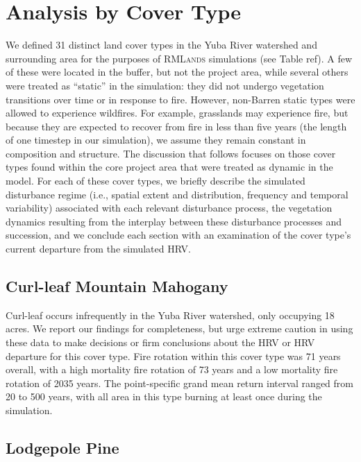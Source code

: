 \section{Analysis by Cover Type}
We defined 31 distinct land cover types in the Yuba River watershed and surrounding area for the purposes of \textsc{RMLands} simulations (see Table ref{}). A few of these were located in the buffer, but not the project area, while several others were treated as ``static'' in the simulation: they did not undergo vegetation transitions over time or in response to fire. However, non-Barren static types were allowed to experience wildfires. For example, grasslands may experience fire, but because they are expected to recover from fire in less than five years (the length of one timestep in our simulation), we assume they remain constant in composition and structure. The discussion that follows focuses on those cover types found within the core project area that were treated as dynamic in the model. For each of these cover types, we briefly describe the simulated disturbance regime (i.e., spatial extent and distribution, frequency and temporal variability) associated with each relevant disturbance process, the vegetation dynamics resulting from the interplay between these disturbance processes and succession, and we conclude each section with an examination of the cover type’s current departure from the simulated HRV. 

\subsection{Curl-leaf Mountain Mahogany}
Curl-leaf occurs infrequently in the Yuba River watershed, only occupying 18 acres. We report our findings for completeness, but urge extreme caution in using these data to make decisions or firm conclusions about the HRV or HRV departure for this cover type. Fire rotation within this cover type was 71 years overall, with a high mortality fire rotation of 73 years and a low mortality fire rotation of 2035 years. The point-specific grand mean return interval ranged from 20 to 500 years, with all area in this type burning at least once during the simulation.




\subsection{Lodgepole Pine} 

